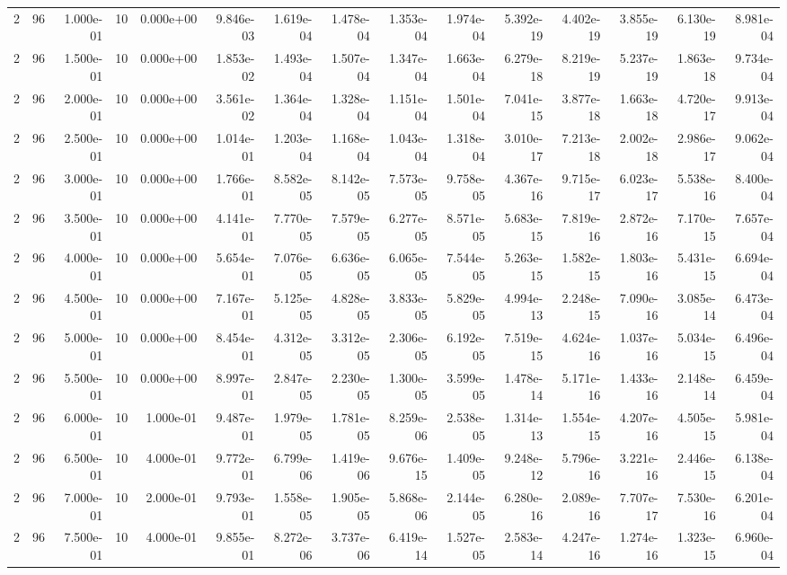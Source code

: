 \begin{tabular}{rrrrrrrrrrrrrrr}
2 & 96 & 1.000e-01 & 10 & 0.000e+00 & 9.846e-03 & 1.619e-04 & 1.478e-04 & 1.353e-04 & 1.974e-04 & 5.392e-19 & 4.402e-19 & 3.855e-19 & 6.130e-19 & 8.981e-04 \\
2 & 96 & 1.500e-01 & 10 & 0.000e+00 & 1.853e-02 & 1.493e-04 & 1.507e-04 & 1.347e-04 & 1.663e-04 & 6.279e-18 & 8.219e-19 & 5.237e-19 & 1.863e-18 & 9.734e-04 \\
2 & 96 & 2.000e-01 & 10 & 0.000e+00 & 3.561e-02 & 1.364e-04 & 1.328e-04 & 1.151e-04 & 1.501e-04 & 7.041e-15 & 3.877e-18 & 1.663e-18 & 4.720e-17 & 9.913e-04 \\
2 & 96 & 2.500e-01 & 10 & 0.000e+00 & 1.014e-01 & 1.203e-04 & 1.168e-04 & 1.043e-04 & 1.318e-04 & 3.010e-17 & 7.213e-18 & 2.002e-18 & 2.986e-17 & 9.062e-04 \\
2 & 96 & 3.000e-01 & 10 & 0.000e+00 & 1.766e-01 & 8.582e-05 & 8.142e-05 & 7.573e-05 & 9.758e-05 & 4.367e-16 & 9.715e-17 & 6.023e-17 & 5.538e-16 & 8.400e-04 \\
2 & 96 & 3.500e-01 & 10 & 0.000e+00 & 4.141e-01 & 7.770e-05 & 7.579e-05 & 6.277e-05 & 8.571e-05 & 5.683e-15 & 7.819e-16 & 2.872e-16 & 7.170e-15 & 7.657e-04 \\
2 & 96 & 4.000e-01 & 10 & 0.000e+00 & 5.654e-01 & 7.076e-05 & 6.636e-05 & 6.065e-05 & 7.544e-05 & 5.263e-15 & 1.582e-15 & 1.803e-16 & 5.431e-15 & 6.694e-04 \\
2 & 96 & 4.500e-01 & 10 & 0.000e+00 & 7.167e-01 & 5.125e-05 & 4.828e-05 & 3.833e-05 & 5.829e-05 & 4.994e-13 & 2.248e-15 & 7.090e-16 & 3.085e-14 & 6.473e-04 \\
2 & 96 & 5.000e-01 & 10 & 0.000e+00 & 8.454e-01 & 4.312e-05 & 3.312e-05 & 2.306e-05 & 6.192e-05 & 7.519e-15 & 4.624e-16 & 1.037e-16 & 5.034e-15 & 6.496e-04 \\
2 & 96 & 5.500e-01 & 10 & 0.000e+00 & 8.997e-01 & 2.847e-05 & 2.230e-05 & 1.300e-05 & 3.599e-05 & 1.478e-14 & 5.171e-16 & 1.433e-16 & 2.148e-14 & 6.459e-04 \\
2 & 96 & 6.000e-01 & 10 & 1.000e-01 & 9.487e-01 & 1.979e-05 & 1.781e-05 & 8.259e-06 & 2.538e-05 & 1.314e-13 & 1.554e-15 & 4.207e-16 & 4.505e-15 & 5.981e-04 \\
2 & 96 & 6.500e-01 & 10 & 4.000e-01 & 9.772e-01 & 6.799e-06 & 1.419e-06 & 9.676e-15 & 1.409e-05 & 9.248e-12 & 5.796e-16 & 3.221e-16 & 2.446e-15 & 6.138e-04 \\
2 & 96 & 7.000e-01 & 10 & 2.000e-01 & 9.793e-01 & 1.558e-05 & 1.905e-05 & 5.868e-06 & 2.144e-05 & 6.280e-16 & 2.089e-16 & 7.707e-17 & 7.530e-16 & 6.201e-04 \\
2 & 96 & 7.500e-01 & 10 & 4.000e-01 & 9.855e-01 & 8.272e-06 & 3.737e-06 & 6.419e-14 & 1.527e-05 & 2.583e-14 & 4.247e-16 & 1.274e-16 & 1.323e-15 & 6.960e-04 \\

\end{tabular}
